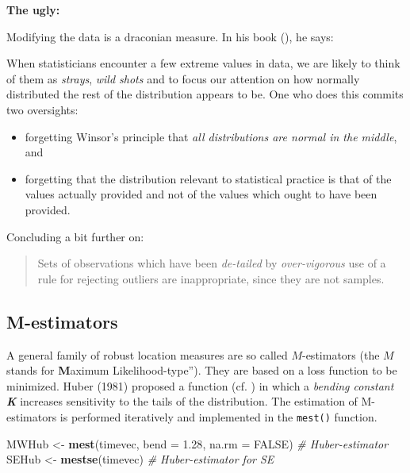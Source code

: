 \documentclass[
]{article}
\newenvironment{Shaded}{\begin{snugshade}}{\end{snugshade}}
\newcommand{\AttributeTok}[1]{\textcolor[rgb]{0.13,0.29,0.53}{#1}}
\newcommand{\CommentTok}[1]{\textcolor[rgb]{0.56,0.35,0.01}{\textit{#1}}}
\newcommand{\ConstantTok}[1]{\textcolor[rgb]{0.56,0.35,0.01}{#1}}
\newcommand{\FloatTok}[1]{\textcolor[rgb]{0.00,0.00,0.81}{#1}}
\newcommand{\FunctionTok}[1]{\textcolor[rgb]{0.13,0.29,0.53}{\textbf{#1}}}
\newcommand{\NormalTok}[1]{#1}
\newcommand{\OtherTok}[1]{\textcolor[rgb]{0.56,0.35,0.01}{#1}}
\providecommand{\tightlist}{%
  \setlength{\itemsep}{0pt}\setlength{\parskip}{0pt}}
\begin{document}
\textbf{The ugly:}

Modifying the data is a draconian measure. In his book (), he says:

When statisticians encounter a few extreme values in data, we are likely to think of them as \emph{strays}, \emph{wild shots} and to focus our attention on how normally distributed the rest of the distribution appears to be. One who does this commits two oversights:

\begin{itemize}
\tightlist
\item
  forgetting Winsor's principle that \emph{all distributions are normal in the middle}, and
\item
  forgetting that the distribution relevant to statistical practice is that of the values actually provided and not of the values which ought to have been provided.
\end{itemize}

Concluding a bit further on:

\begin{quote}
Sets of observations which have been \emph{de-tailed} by \emph{over-vigorous} use of a rule for rejecting outliers are inappropriate, since they are not samples.
\end{quote}

\subsection*{M-estimators}\label{m-estimators}

A general family of robust location measures are so called \(M\)-estimators (the \(M\) stands for \textbf{M}aximum Likelihood-type''). They are based on a loss function to be minimized. Huber (1981) proposed a function (cf. ) in which a \emph{bending constant \textbf{K} } increases sensitivity to the tails of the distribution. The estimation of M-estimators is performed iteratively and implemented in the \texttt{mest()} function.

\begin{Shaded}
\begin{Highlighting}[]
\NormalTok{  MWHub }\OtherTok{\textless{}{-}} \FunctionTok{mest}\NormalTok{(timevec, }\AttributeTok{bend =} \FloatTok{1.28}\NormalTok{, }\AttributeTok{na.rm =} \ConstantTok{FALSE}\NormalTok{) }\CommentTok{\# Huber{-}estimator}
\NormalTok{  SEHub }\OtherTok{\textless{}{-}} \FunctionTok{mestse}\NormalTok{(timevec)                           }\CommentTok{\# Huber{-}estimator for SE}
\end{Highlighting}
\end{Shaded}
\end{document}
